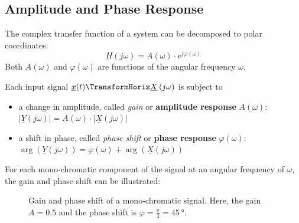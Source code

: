 \begin{refsection}
\subsection{Amplitude and Phase Response}

The complex transfer function of a system can be decomposed to polar coordinates:
\begin{equation}
	\underline{H}\left(j \omega\right) = A(\omega) \cdot e^{j \varphi(\omega)}
\end{equation}
Both $A(\omega)$ and $\varphi(\omega)$ are functions of the angular frequency $\omega$.  

Each input signal $\underline{x}(t) \TransformHoriz \underline{X}\left(j \omega\right)$ is subject to
\begin{itemize}
	\item a change in amplitude, called \emph{gain} or  \textbf{amplitude response} $A(\omega)$: $|\underline{Y}\left(j \omega\right)| = A(\omega) \cdot |\underline{X}\left(j \omega\right)|$
	\item a shift in phase, called \emph{phase shift} or  \textbf{phase response} $\varphi(\omega)$: $\arg\left(\underline{Y}\left(j \omega\right)\right) = \varphi(\omega) + \arg\left(\underline{X}\left(j \omega\right)\right)$
\end{itemize}

For each mono-chromatic component of the signal at an angular frequency of $\omega$, the gain and phase shift can be illustrated:
\begin{figure}[H]
	\centering
	\caption[Gain and phase shift of a mono-chromatic signal]{Gain and phase shift of a mono-chromatic signal. Here, the gain $A = 0.5$ and the phase shift is $\varphi = \frac{\pi}{4} = \SI{45}{\degree}$.}
	\label{fig:ch02:gain_phase_shift}
\end{figure}


\end{refsection}
